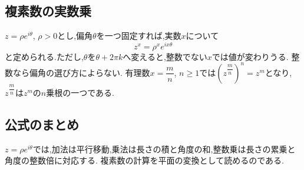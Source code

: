   \subsection{複素数の実数乗}\label{節：複素数の実数乗}
    $z=\rho e^{i\theta}$, $\rho>0$とし,偏角$\theta$を一つ固定すれば,実数$x$について
    \[
      z^x=\rho^x e^{ix\theta}
    \]
    と定められる.ただし,$\theta$を$\theta+2\pi k$へ変えると,整数でない$x$では値が変わりうる.
    整数なら偏角の選び方によらない.
    有理数$x=\dfrac{m}{n}$, $n\ge1$では$\left(z^{\dfrac{m}{n}}\right)^n=z^m$となり,$z^{\dfrac{m}{n}}$は$z^m$の$n$乗根の一つである.

  \subsection{公式のまとめ}\label{節：議論のまとめ}
    $z=\rho e^{i\theta}$では,加法は平行移動,乗法は長さの積と角度の和,整数乗は長さの累乗と角度の整数倍に対応する.
    複素数の計算を平面の変換として読めるのである.
